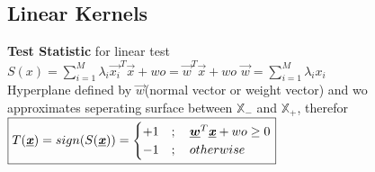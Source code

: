 \begin{sectionbox}
\subsection{Linear Kernels}
\textbf{Test Statistic} for linear test \\
$\boxed{S(x) = \sum_{i = 1}^{M}\lambda_i\vec{x_i}^T\vec{x} + wo = \vec{w}^T\vec{x} +wo}$ $\vec{w} = \sum_{i = 1}^{M}\lambda_ix_i$ \\
Hyperplane defined by $\vec{w}$(normal vector or weight vector) and wo\\ approximates seperating surface between $\mathbb{X_-}$ and $\mathbb{X_+}$, therefor \\
$\boxed{T(\underline{\textbf{\textit{x}}}) = sign(S(\underline{\textbf{\textit{x}}})) = \begin{cases} 
			+1&;\quad \underline{\boldsymbol{w}}^T\underline{\textbf{\textit{x}}} +wo \geq 0\\
	        -1&;\quad otherwise
	\end{cases}}$\\ 

\end{sectionbox}
